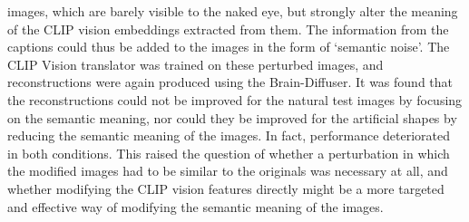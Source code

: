 images, which are barely visible to the naked eye, but strongly alter the meaning of the CLIP vision embeddings extracted from them. The information from the captions could thus be added to the images in the form of `semantic noise'. The CLIP Vision translator was trained on these perturbed images, and reconstructions were again produced using the Brain-Diffuser. It was found that the reconstructions could not be improved for the natural test images by focusing on the semantic meaning, nor could they be improved for the artificial shapes by reducing the semantic meaning of the images. In fact, performance deteriorated in both conditions. This raised the question of whether a perturbation in which the modified images had to be similar to the originals was necessary at all, and whether modifying the CLIP vision features directly might be a more targeted and effective way of modifying the semantic meaning of the images.

